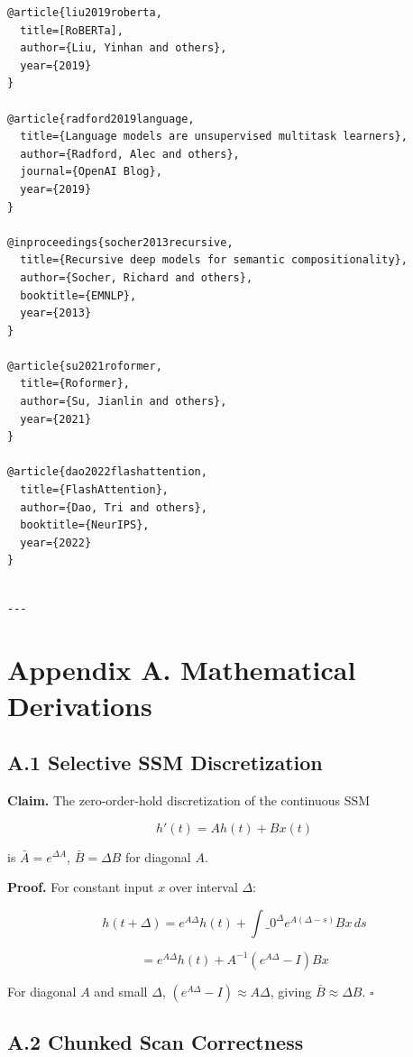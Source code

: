 \begin{lstlisting}
@article{liu2019roberta,
  title=[RoBERTa],
  author={Liu, Yinhan and others},
  year={2019}
}

@article{radford2019language,
  title={Language models are unsupervised multitask learners},
  author={Radford, Alec and others},
  journal={OpenAI Blog},
  year={2019}
}

@inproceedings{socher2013recursive,
  title={Recursive deep models for semantic compositionality},
  author={Socher, Richard and others},
  booktitle={EMNLP},
  year={2013}
}

@article{su2021roformer,
  title={Roformer},
  author={Su, Jianlin and others},
  year={2021}
}

@article{dao2022flashattention,
  title={FlashAttention},
  author={Dao, Tri and others},
  booktitle={NeurIPS},
  year={2022}
}
\end{lstlisting}
\begin{lstlisting}

---
\end{lstlisting}


\section{Appendix A. Mathematical Derivations}

\subsection{A.1 Selective SSM Discretization}

\textbf{Claim.} The zero-order-hold discretization of the continuous SSM

\[
h'(t) = A h(t) + B x(t)
\tag{A.1}
\]

is $\bar{A} = e^{\Delta A}$, $\bar{B} = \Delta B$ for diagonal $A$.

\textbf{Proof.} For constant input $x$ over interval $\Delta$:

\[
h(t + \Delta) = e^{A \Delta} h(t) + \int\_0^\Delta e^{A(\Delta - s)} B x \, ds
\]

\[
= e^{A \Delta} h(t) + A^{-1}(e^{A \Delta} - I) B x
\]

For diagonal $A$ and small $\Delta$, $(e^{A\Delta} - I) \approx A \Delta$, 
giving $\bar{B} \approx \Delta B$. $\square$

\subsection{A.2 Chunked Scan Correctness}

